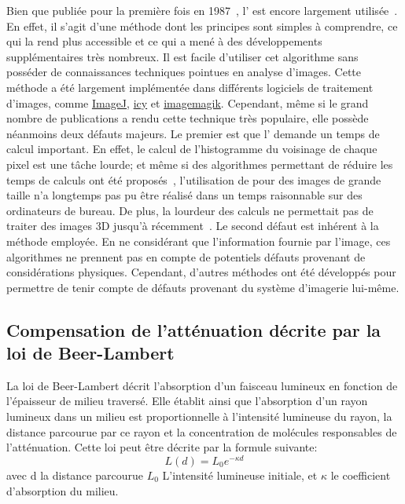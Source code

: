 \documentclass[\main/main.tex]{subfiles}
\begin{document}
%
Bien que publiée pour la première fois en 1987~\cite{pizer_1987},
l'\clahe{} est encore largement utilisée~\cite{dabass_2019,sonali_2018,lv_2019}.
%
En effet, il s'agit d'une méthode dont les principes sont simples à comprendre, ce qui la rend plus accessible et ce qui a mené à des développements supplémentaires très nombreux. Il est facile d'utiliser cet algorithme sans posséder de connaissances techniques pointues en analyse d'images.
%
Cette méthode a été largement implémentée dans différents logiciels de traitement d'images, comme \href{https://imagej.net/Enhance_Local_Contrast_(CLAHE)}{ImageJ},
\href{http://icy.bioimageanalysis.org/plugin/adaptive-histogram-equalization/}{icy} et \href{https://imagemagick.org/script/clahe.php}{imagemagik}.
%
Cependant, même si le grand nombre  de publications a rendu cette technique très populaire, elle possède néanmoins deux défauts majeurs.
%
Le premier est que l'\clahe{} demande un temps de calcul important.
%
En effet, le calcul de l'histogramme du voisinage de chaque pixel est une tâche lourde; et même si des algorithmes permettant de réduire les temps de calculs ont été proposés~\cite{sund_2006}, l'utilisation de \clahe{} pour des images de grande taille n'a longtemps pas pu être réalisé dans un temps raisonnable sur des ordinateurs de bureau. De plus, la lourdeur des calculs ne permettait pas de traiter des images 3D jusqu'à récemment~\cite{amorim_2018, stimper_2019}.
%
Le second défaut est inhérent à la méthode employée.
%
En ne considérant que l'information fournie par l'image, ces algorithmes ne prennent pas en compte de potentiels défauts provenant de considérations physiques.
%
Cependant, d'autres méthodes ont été développés pour permettre de tenir compte de défauts provenant du système d'imagerie lui-même.

\subsection{Compensation de l'atténuation décrite par la loi de Beer-Lambert} %

%
La loi de Beer-Lambert décrit l'absorption d'un faisceau lumineux en fonction de l'épaisseur de milieu traversé. Elle établit ainsi que l'absorption d'un rayon lumineux dans un milieu est proportionnelle à l'intensité lumineuse du rayon, la distance parcourue par ce rayon et la concentration de molécules responsables de l'atténuation.
%
Cette loi peut être décrite par la formule suivante:
\begin{equation}
    L(d) = L_{0}e^{-\kappa{}d}
\end{equation}
avec d la distance parcourue $L_{0}$ L'intensité lumineuse initiale, et $\kappa{}$ le coefficient d'absorption du milieu.
\end{document}
